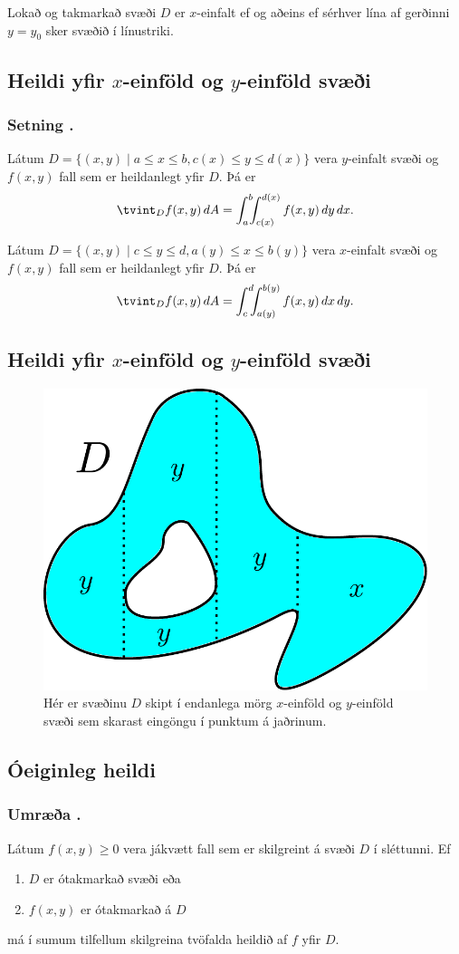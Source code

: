\medskip
Lokað og takmarkað svæði $D$ er $x$-einfalt ef og aðeins ef sérhver lína af gerðinni $y=y_0$ sker svæðið í línustriki.






\subsection{Heildi yfir $x$-einföld og $y$-einföld svæði} 

\subsubsection{Setning \kaflanr.}
Látum 
$D=\{(x,y)\mid a\leq x\leq b, c(x)\leq y\leq d(x)\}$
vera $y$-einfalt svæði og $f(x,y)$ fall sem er heildanlegt yfir $D$.  Þá er 
$$\tvint_D f(x,y)\,dA=\int_a^b\!\!\!\int_{c(x)}^{d(x)}f(x,y)\,dy\, dx.$$


\medskip
Látum 
$D=\{(x,y)\mid c\leq y\leq d, a(y)\leq x\leq b(y)\}$
vera $x$-einfalt svæði og $f(x,y)$ fall sem er heildanlegt yfir $D$.  Þá er 
$$\tvint_D f(x,y)\,dA=\int_c^d\!\!\!\int_{a(y)}^{b(y)}f(x,y)\,dx\, dy.$$





\subsection{Heildi yfir $x$-einföld og $y$-einföld svæði}
 \begin {figure}[h!]
 \centering
            \includegraphics[width=0.35\linewidth]{einfalt2}
            \caption*{Hér er svæðinu $D$ skipt í endanlega mörg $x$-einföld og $y$-einföld svæði sem skarast eingöngu í punktum á jaðrinum.}
\end {figure}



\subsection{Óeiginleg heildi}
 \subsubsection{Umræða \kaflanr.}
  Látum $f(x,y)\geq 0$ vera jákvætt fall sem er skilgreint á svæði $D$ í sléttunni. Ef
  \begin {enumerate}
   \item $D$ er ótakmarkað svæði eða
   \item $f(x,y)$ er ótakmarkað á $D$
  \end {enumerate}
má í sumum tilfellum skilgreina tvöfalda heildið af $f$ yfir $D$.

